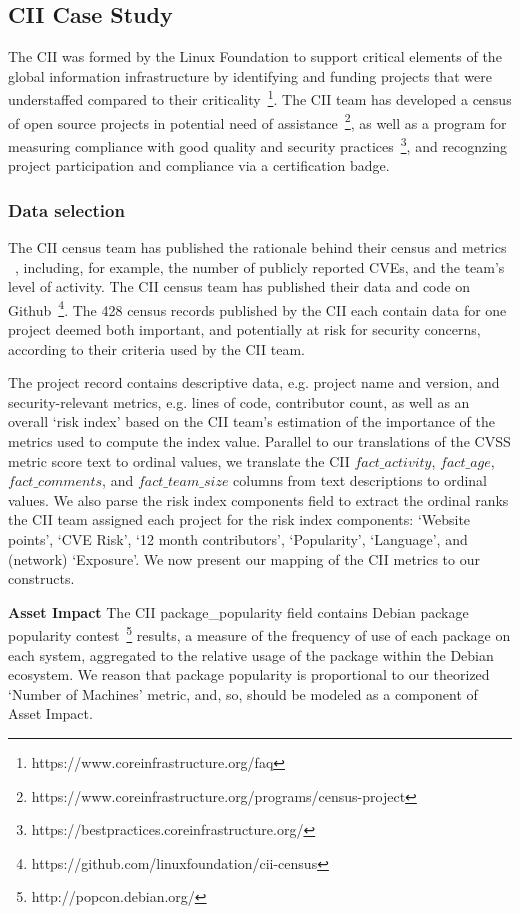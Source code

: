 \subsection{CII Case Study}
The CII was formed by the Linux Foundation to support critical elements of the global information infrastructure by identifying and funding projects that were understaffed compared to their criticality~\footnote{https://www.coreinfrastructure.org/faq}. The CII team has developed a census of open source projects in potential need of assistance~\footnote{https://www.coreinfrastructure.org/programs/census-project}, as well as a program for measuring compliance with good quality and security practices~\footnote{https://bestpractices.coreinfrastructure.org/}, and recognzing project participation and compliance via a certification badge.

\subsubsection{Data selection}
\label{sec:cii_selection}
The CII census team has published the rationale behind their census and metrics ~\cite{wheeler2015open}, including, for example, the number of publicly reported CVEs, and the team's level of activity.  The CII census team has published their data and code on Github~\footnote{https://github.com/linuxfoundation/cii-census}. The 428 census records published by the CII each contain data for one project deemed both important, and potentially at risk for security concerns, according to their criteria used by the CII team.

The project record contains descriptive data, e.g. project name and version, and security-relevant metrics, e.g. lines of code, contributor count, as well as an overall `risk index' based on the CII team's estimation of the importance of the metrics used to compute the index value.  Parallel to our translations of the CVSS metric score text to ordinal values, we translate the CII $fact\_activity$, $fact\_age$, $fact\_comments$, and $fact\_team\_size$ columns from text descriptions to ordinal values. We also parse the risk index components field to extract the ordinal ranks the CII team assigned each project for the risk index components: `Website points', `CVE Risk', `12 month contributors', `Popularity', `Language', and (network) `Exposure'. We now present our mapping of the CII metrics to our constructs.

\textbf{Asset Impact}
The CII package\_popularity field contains Debian package popularity contest~\footnote{http://popcon.debian.org/} results, a measure of the frequency of use of each package on each system, aggregated to the relative usage of the package within the Debian ecosystem. We reason that package popularity is proportional to our theorized `Number of Machines'  metric, and, so, should be modeled as a component of Asset Impact.

